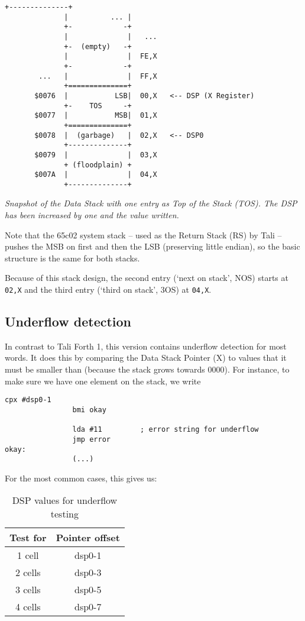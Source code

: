 \begin{lstlisting}[frame=single]
              +--------------+           
              |          ... |  
              +-            -+ 
              |              |   ...
              +-  (empty)   -+
              |              |  FE,X
              +-            -+ 
        ...   |              |  FF,X
              +==============+  
       $0076  |           LSB|  00,X   <-- DSP (X Register)
              +-    TOS     -+ 
       $0077  |           MSB|  01,X
              +==============+ 
       $0078  |  (garbage)   |  02,X   <-- DSP0 
              +--------------+           
       $0079  |              |  03,X
              + (floodplain) + 
       $007A  |              |  04,X
              +--------------+           
\end{lstlisting}

\textit{Snapshot of the Data Stack with one entry as Top of the Stack (TOS). The
DSP has been increased by one and the value written.}

Note that the 65c02 system stack -- used as the Return Stack (RS) by Tali --
pushes the MSB on first and then the LSB (preserving little endian), so the
basic structure is the same for both stacks. 

Because of this stack design, the second entry (`next on stack', NOS) starts at
\texttt{02,X} and the third entry (`third on stack', 3OS) at \texttt{04,X}. 

\subsection{Underflow detection} In contrast to Tali
Forth 1, this version contains underflow detection for most
words. It does this by comparing the Data Stack Pointer (X) to
values that it must be smaller than (because the stack grows towards 0000). For
instance, to make sure we have one element on the stack, we write

\begin{lstlisting}[frame=lines]
                cpx #dsp0-1
                bmi okay

                lda #11         ; error string for underflow
                jmp error
okay:
                (...)
\end{lstlisting}

\noindent For the most common cases, this gives us:

\begin{table}[h!]
\centering
\begin{tabular}{ | c | c | }
        \hline
        Test for &  Pointer offset\\
        \hline
        1 cell   &  dsp0-1\\
        2 cells  &  dsp0-3\\
        3 cells  &  dsp0-5\\
        4 cells  &  dsp0-7\\
        \hline
\end{tabular}
        \caption{DSP values for underflow testing}
        \label{table_uf}
\end{table}


